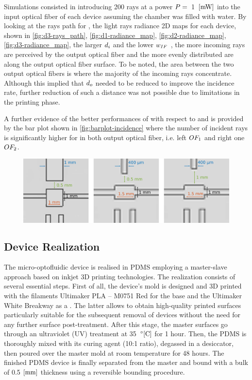 \documentclass[sn-mathphys]{sn-jnl}
\theoremstyle{thmstyleone}%
\theoremstyle{thmstyletwo}%
\theoremstyle{thmstylethree}%
\begin{document}
Simulations consisted in introducing 200 rays at a power $P=$~1~$[\rm mW]$ into the input optical fiber of each device assuming the chamber was filled with water. 
By looking at the rays path for , the light rays radiance 2D maps for each device, shown in \fig\ref{fig:d3-rays_path}, \ref{fig:d1-radiance_map}, \ref{fig:d2-radiance_map}, \ref{fig:d3-radiance_map}, the larger $d_{i}$ and the lower $w_{IF}$ , the more incoming rays are perceived by the output optical fiber and the more evenly distributed are along the output optical fiber surface. To be noted, the area between the two output optical fibers is where the majority of the incoming rays concentrate. Although this implied that $d_{o}$ needed to be reduced to improve the incidence rate, further reduction of such a distance was not possible due to limitations in the printing phase. 

A further evidence of the better performances of  with respect to   and   is provided by the bar plot shown in \fig\ref{fig:barplot-incidence} where the number of incident rays is significantly higher for  in both output optical fiber, i.e. left $OF_{1}$ and right one $OF_{2}$. 

\begin{figure}		
	\includegraphics[width=\textwidth, height=0.3\linewidth]{cad-devices.png}
	\caption{}
	\label{fig:cad-devices}
\end{figure}

\subsection{Device Realization}

The micro-optofluidic device is realised in PDMS employing a master-slave approach based on inkjet 3D printing technologies. 
The realization consists of several essential steps. First of all, the device's mold is designed and 3D printed with the filaments Ultimaker PLA – M0751 Red for the base and the Ultimaker White Breakway as a . The latter allows to obtain high-quality printed surfaces particularly suitable for the subsequent removal of devices without the need for any further surface post-treatment.
After this stage, the master surfaces go through an ultraviolet (UV) treatment at 35~$^{\circ}[\rm C]$ for 1 hour. 
Then, the PDMS is thoroughly mixed with its curing agent (10:1 ratio), degassed in a desiccator, then poured over the master mold at room temperature for 48 hours. The finished PDMS device is finally separated from the master and bound with a bulk of 0.5 $[\rm mm]$ thickness using a reversible bounding procedure.
\end{document}
